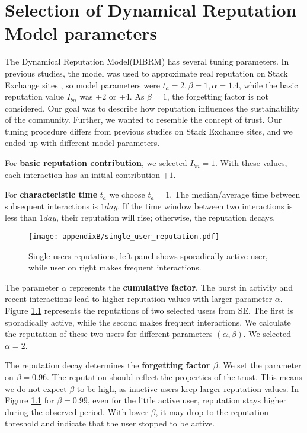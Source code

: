 \chapter{Selection of Dynamical Reputation Model parameters}
\label{App:parameters}

The Dynamical Reputation Model(DIBRM) has several tuning parameters. In previous studies, the model \cite{melnikov2018toward,yashkina2020} was used to approximate real reputation on Stack Exchange sites \cite{yashkina2020}, so model parameters were $t_a =2, \beta = 1, \alpha = 1.4$, while the basic reputation value $I_{bn}$ was +2 or +4. As $\beta=1$, the forgetting factor is not considered. Our goal was to describe how reputation influences the sustainability of the community. Further, we wanted to resemble the concept of trust. Our tuning procedure differs from previous studies on Stack Exchange sites, and we ended up with different model parameters. 

For \textbf{basic reputation contribution}, we selected $I_{bn}=1$. With these values, each interaction has an initial contribution $+1$. 

For \textbf{characteristic time} $t_a$ we choose $t_a=1$. The median/average time between subsequent interactions is $1 day$. If the time window between two interactions is less than $1 day$, their reputation will rise; otherwise, the reputation decays.

\begin{figure}[h]
	\centering
	\texttt{[image: appendixB/single\_user\_reputation.pdf]}
	\caption[Single users reputations.]{Single users reputations, left panel shows sporadically active user, while user on right makes frequent interactions. }
	\label{fig:singleuser}
\end{figure} 

The {parameter $\alpha$} represents the \textbf{cumulative factor}. The burst in activity and recent interactions lead to higher reputation values with larger parameter $\alpha$. Figure \ref{fig:singleuser} represents the reputations of two selected users from SE. The first is sporadically active, while the second makes frequent interactions. We calculate the reputation of these two users for different parameters $(\alpha, \beta)$. We selected $\alpha=2$.  

The reputation decay determines the \textbf{forgetting factor $\beta$}. We set the parameter on $\beta=0.96$. The reputation should reflect the properties of the trust. This means we do not expect $\beta$ to be high, as inactive users keep larger reputation values. In Figure \ref{fig:singleuser} for $\beta=0.99$, even for the little active user, reputation stays higher during the observed period. With lower $\beta$, it may drop to the reputation threshold and indicate that the user stopped to be active.  

